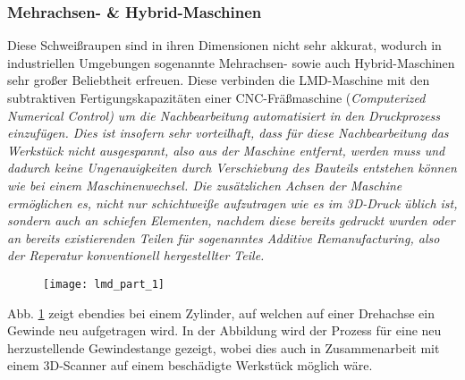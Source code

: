 \documentclass[../main.tex]{subfiles}
\begin{document}
\subsubsection{Mehrachsen- \& Hybrid-Maschinen}
Diese Schweißraupen sind in ihren Dimensionen nicht sehr akkurat, wodurch in  industriellen Umgebungen sogenannte Mehrachsen- sowie auch Hybrid-Maschinen sehr großer Beliebtheit erfreuen. Diese verbinden die LMD-Maschine mit den subtraktiven Fertigungskapazitäten einer CNC-Fräßmaschine (\it{Computerized Numerical Control}) um die Nachbearbeitung automatisiert in den Druckprozess einzufügen. Dies ist insofern sehr vorteilhaft, dass für diese Nachbearbeitung das Werkstück nicht ausgespannt, also aus der Maschine entfernt, werden muss und dadurch keine Ungenauigkeiten durch Verschiebung des Bauteils entstehen können wie bei einem Maschinenwechsel.
Die zusätzlichen Achsen der Maschine ermöglichen es, nicht nur schichtweiße aufzutragen wie es im 3D-Druck üblich ist, sondern auch an schiefen Elementen, nachdem diese bereits gedruckt wurden oder an bereits existierenden Teilen für sogenanntes Additive Remanufacturing, also der Reperatur konventionell hergestellter Teile. \parencite{ALL3D_2}
\begin{figure}[h]
	\begin{center}
	\texttt{[image: lmd\_part\_1]}	
		\label{img:lmd_part_1}
	\end{center}
	
\end{figure}
Abb. \ref{img:lmd_part_1} zeigt ebendies bei einem Zylinder, auf welchen auf einer Drehachse ein Gewinde neu aufgetragen wird. In der Abbildung wird der Prozess für eine neu herzustellende Gewindestange gezeigt, wobei dies auch in Zusammenarbeit mit einem 3D-Scanner auf einem beschädigte Werkstück möglich wäre. 
\end{document}
